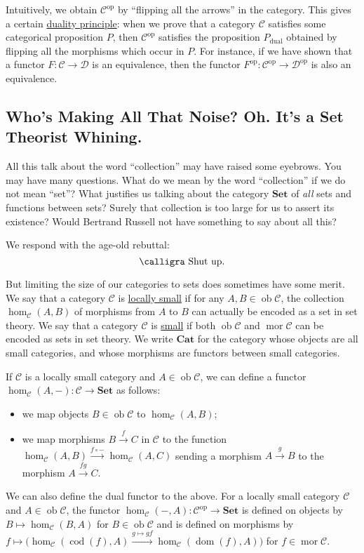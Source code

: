 \documentclass[a4paper,11pt]{article}
\theoremstyle{break_italics}
\theoremstyle{break_upright}
\theoremstyle{remark}
\newcommand{\ob}{\operatorname{ob}}
\newcommand{\mor}{\operatorname{mor}}
\newcommand{\C}{\mathcal{C}}
\newcommand{\D}{\mathcal{D}}
\newcommand{\Set}{\mathbf{Set}}
\newcommand{\op}{\mathrm{op}}
\newcommand{\dom}{\operatorname{dom}}
\newcommand{\cod}{\operatorname{cod}}
\begin{document}
Intuitively, we obtain $\C^\op$ by ``flipping all the arrows'' in the category. This gives a certain \uline{duality principle}: when we prove that a category $\C$ satisfies some categorical proposition $P$, then $\C^\op$ satisfies the proposition $P_{\text{dual}}$ obtained by flipping all the morphisms which occur in $P$. For instance, if we have shown that a functor $F \colon \C \to \D$ is an equivalence, then the functor $F^\op \colon \C^\op \to \D^\op$ is also an equivalence.




\subsection{Who's Making All That Noise? Oh. It's a Set Theorist Whining.}

All this talk about the word ``collection'' may have raised some eyebrows. You may have many questions. What do we mean by the word ``collection'' if we do not mean ``set''? What justifies us talking about the category $\Set$ of \textit{all} sets and functions between sets? Surely that collection is too large for us to assert its existence? Would Bertrand Russell not have something to say about all this?

We respond with the age-old rebuttal:
\[
	\text{\calligra Shut up.}
\]

But limiting the size of our categories to sets does sometimes have some merit. We say that a category $\C$ is \uline{locally small} if for any $A, B \in \ob\C$, the collection $\hom_\C(A,B)$ of morphisms from $A$ to $B$ can actually be encoded as a set in set theory. We say that a category $\C$ is \uline{small} if both $\ob\C$ and $\mor\C$ can be encoded as sets in set theory. We write $\mathbf{Cat}$ for the category whose objects are all small categories, and whose morphisms are functors between small categories.

If $\C$ is a locally small category and $A \in \ob\C$, we can define a functor $\hom_\C(A, -) \colon \C \to \Set$ as follows:
\begin{itemize}
	\item we map objects $B \in \ob\C$ to $\hom_\C(A,B)$;
	\item we map morphisms $B \xrightarrow{f} C$ in $\C$ to the function $\hom_\C(A,B) \xrightarrow{f \circ -} \hom_\C(A, C)$ sending a morphism $A \xrightarrow{g} B$ to the morphism $A \xrightarrow{fg} C$.
\end{itemize}
We can also define the dual functor to the above. For a locally small category $\C$ and $A \in \ob\C$, the functor $\hom_\C(-,A) \colon \C^\op \to \Set$ is defined on objects by $B \mapsto \hom_\C(B,A)$ for $B \in \ob\C$ and is defined on morphisms by $f \mapsto \big(\hom_\C(\cod(f),A) \xrightarrow{g \mapsto gf} \hom_\C(\dom(f),A)\big)$ for $f \in \mor\C$.
\end{document}

